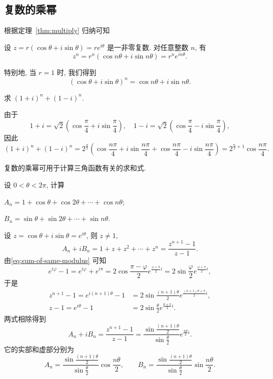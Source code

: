 \subsection{复数的乘幂}

根据定理~\ref{thm:multiply} 归纳可知
\begin{theorem}
  设 $z=r(\cos\theta+i\sin\theta)=re^{i\theta}$ 是一非零复数.
  对任意整数 $n$, 有
  \[z^n=r^n(\cos{n\theta}+i\sin{n\theta})=r^ne^{in\theta}.\]
\end{theorem}
特别地, 当 $r=1$ 时, 我们得到
\[(\cos\theta+i\sin\theta)^n=\cos{n\theta}+i\sin{n\theta}.\]

\begin{example}
  求 $(1+i)^n+(1-i)^n$.
\end{example}

\begin{solution}
  由于
  \[
    1+i=\sqrt2(\cos\frac\pi4+i\sin\frac\pi4),\quad
    1-i=\sqrt2(\cos\frac\pi4-i\sin\frac\pi4),
  \]
  因此
    \[
       (1+i)^n+(1-i)^n
      =2^{\frac n2}(\cos\frac{n\pi}4+i\sin\frac{n\pi}4 
       +\cos\frac{n\pi}4-i\sin\frac{n\pi}4)
      =2^{\frac n2+1}\cos\frac{n\pi}4.
    \]
\end{solution}

复数的乘幂可用于计算三角函数有关的求和式.
\begin{example}
  设 $0<\theta<2\pi$, 计算
  \begin{enumpar}[(i)]
    \item $A_n=1+\cos\theta+\cos{2\theta}+\cdots+\cos{n\theta}$;
    \item $B_n=\sin\theta+\sin{2\theta}+\cdots+\sin{n\theta}$.
  \end{enumpar}
\end{example}

\begin{solution}
  设 $z=\cos\theta+i\sin\theta=e^{i\theta}$, 则 $z\neq 1$,
  \[A_n+iB_n=1+z+z^2+\cdots+z^n=\frac{z^{n+1}-1}{z-1}.\]
  由\ref{eq:sum-of-same-modulus} 可知
  \[e^{i\varphi}-1=e^{i\varphi}+e^{i\pi}=2\cos\frac{\pi-\varphi}2e^{\frac{\varphi+\pi}2i}=2\sin\frac\varphi2 e^{\frac{\varphi+\pi}2i},\]
  于是
  \begin{align*}
    z^{n+1}-1=e^{i(n+1)\theta}-1&=2\sin{\frac{(n+1)\theta}2}e^{\frac{(n+1)\theta+\pi}2i},\\
    z-1=e^{i\theta}-1&=2\sin{\frac\theta2}e^{\frac{\theta+\pi}2i}.
  \end{align*}
  两式相除得到
  \[A_n+iB_n=\frac{z^{n+1}-1}{z-1}=\frac{\sin\frac{(n+1)\theta}2}{\sin\frac\theta2}e^{\frac{n\theta}2i}.\]
  它的实部和虚部分别为
  \[A_n=\frac{\sin\frac{(n+1)\theta}2}{\sin\frac\theta2}\cos\frac{n\theta}2,\qquad
  B_n=\frac{\sin\frac{(n+1)\theta}2}{\sin\frac\theta2}\sin\frac{n\theta}2.\]
\end{solution}

